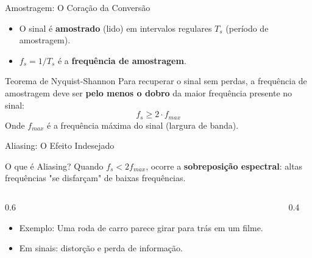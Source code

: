 \documentclass{beamer}
\begin{document}
\begin{frame}{Amostragem: O Coração da Conversão}
    \begin{itemize}
        \item O sinal é \textbf{amostrado} (lido) em intervalos regulares $T_s$ (período de amostragem).
        \item $f_s = 1/T_s$ é a \textbf{frequência de amostragem}.
    \end{itemize}
    \begin{block}{Teorema de Nyquist-Shannon}
        Para recuperar o sinal sem perdas, a frequência de amostragem deve ser \textbf{pelo menos o dobro} da maior frequência presente no sinal:
        \[
            f_s \ge 2 \cdot f_{max}
        \]
        Onde $f_{max}$ é a frequência máxima do sinal (largura de banda).
    \end{block}
\end{frame}

\begin{frame}{Aliasing: O Efeito Indesejado}
    \begin{block}{O que é Aliasing?}
        Quando $f_s < 2 f_{max}$, ocorre a \textbf{sobreposição espectral}: altas frequências "se disfarçam" de baixas frequências.
    \end{block}
    \begin{columns}[c]
        \begin{column}{0.6\textwidth}
            \begin{itemize}
                \item Exemplo: Uma roda de carro parece girar para trás em um filme.
                \item Em sinais: distorção e perda de informação.
            \end{itemize}
        \end{column}
        \begin{column}{0.4\textwidth}
        \end{column}
    \end{columns}
\end{frame}
\end{document}

